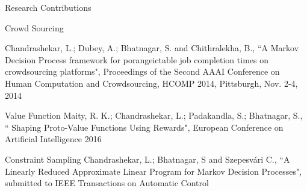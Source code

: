 \documentclass[10pt]{beamer}
\begin{document}
\begin{frame}[fragile]{Research Contributions}
\begin{block}{Crowd Sourcing}

Chandrashekar, L.;  Dubey, A.; Bhatnagar, S. and Chithralekha, B., ``A Markov Decision Process framework for porangeictable job completion times on crowdsourcing platforms", Proceedings of the Second {AAAI} Conference on Human Computation and Crowdsourcing, {HCOMP} 2014, Pittsburgh, Nov. 2-4, 2014
\end{block}
\begin{block}{Value Function}
Maity, R. K.; Chandrashekar, L.;  Padakandla, S.; Bhatnagar, S., `` Shaping Proto-Value Functions Using Rewards", European Conference on Artificial Intelligence 2016\\
\end{block}
\begin{block}{Constraint Sampling}
Chandrashekar, L.;  Bhatnagar, S and Szepesv\'{a}ri C., ``A Linearly Reduced Approximate Linear Program for Markov Decision Processes", submitted to IEEE Transactions on Automatic Control
\end{block}

\end{frame}
\end{document}

